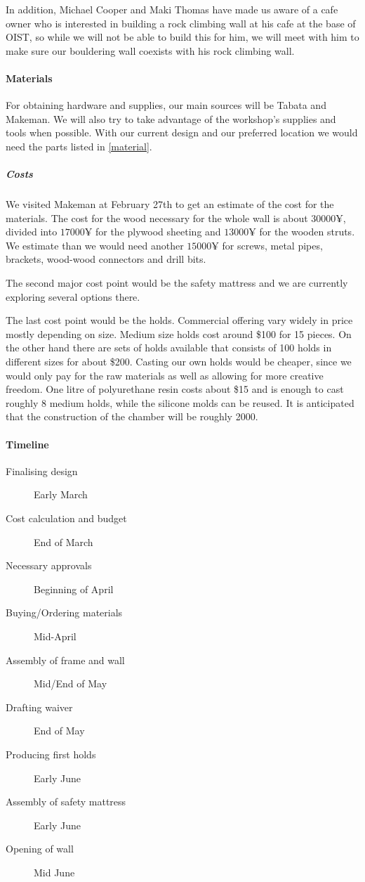 \documentclass[a4paper, 12pt]{scrartcl}
\begin{document}
In addition, Michael Cooper and Maki Thomas have made us aware of a cafe owner who is interested in building a rock climbing wall at his cafe at the base of OIST, so while we will not be able to build this for him, we will meet with him to make sure our bouldering wall coexists with his rock climbing wall.

\paragraph{Materials}
For obtaining hardware and supplies, our main sources will be Tabata and Makeman. We will also try to take advantage of the workshop's supplies and tools when possible. With our current design and our preferred location we would need the parts listed in \cref{material}.

\subparagraph{Costs}
We visited Makeman at February 27th to get an estimate of the cost for the materials. The cost for the wood necessary for the whole wall is about $30000\yen$, divided into $17000\yen$ for the plywood sheeting and $13000\yen$ for the wooden struts. We estimate than we would need another $15000\yen$ for screws, metal pipes, brackets, wood-wood connectors and drill bits.

The second major cost point would be the safety mattress and we are currently exploring several options there.

The last cost point would be the holds. Commercial offering vary widely in price mostly depending on size. Medium size holds cost around \$100 for 15 pieces. On the other hand there are sets of holds available that consists of 100 holds in different sizes for about \$200. Casting our own holds would be cheaper, since we would only pay for the raw materials as well as allowing for more creative freedom. One litre of polyurethane resin costs about \$15 and is enough to cast roughly 8 medium holds, while the silicone molds can be reused. It is anticipated that the construction of the chamber will be roughly 2000\yen. 

\paragraph{Timeline}
\begin{description}
  \item[Finalising design] Early March
  \item[Cost calculation and budget] End of March
  \item[Necessary approvals] Beginning of April
  \item[Buying/Ordering materials] Mid-April
  \item[Assembly of frame and wall] Mid/End of May
  \item[Drafting waiver] End of May
  \item[Producing first holds] Early June
  \item[Assembly of safety mattress] Early June
  \item[Opening of wall] Mid June
\end{description}
\end{document}
